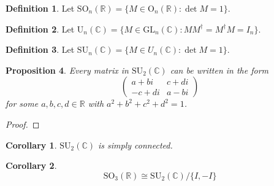\documentclass{book}
\let\qed\relax
\newtheorem{prop}{Proposition}[chapter]
\newtheorem{cor}{Corollary}[prop]
\theoremstyle{definition}
\newtheorem{df}[prop]{Definition}
\newcommand{\inv}[1]{\ensuremath{{#1}^{-1}}}
\begin{document}

\begin{df}
Let $\mathrm{SO}_n(\mathbb{R}) = \{ M \in \mathrm{O}_n(\mathbb{R}) : \det M = 1 \}$.
\end{df}

\begin{df}
Let $\mathrm{U}_n(\mathbb{C}) = \{ M \in \mathrm{GL}_n(\mathbb{C}) : M M^\dagger = M^\dagger M = I_n \}$.
\end{df}

\begin{df}
Let $\mathrm{SU}_n(\mathbb{C}) = \{ M \in U_n(\mathbb{C}) : \det M = 1 \}$.
\end{df}

\begin{prop}
Every matrix in $\mathrm{SU}_2(\mathbb{C})$ can be written in the form
\[ \left( \begin{array}{cc}
a + b i & c + d i \\
-c + di & a - bi
\end{array} \right) \]
for some $a,b,c,d \in \mathbb{R}$ with $a^2 + b^2 + c^2 + d^2 = 1$.
\end{prop}

\begin{proof}
\pf
{}
\step{2}{$\inv{M} = M^\dagger$}
\qed
\end{proof}

\begin{cor}
$\mathrm{SU}_2(\mathbb{C})$ is simply connected.
\end{cor}


\begin{cor}
\[ \mathrm{SO}_3(\mathbb{R}) \cong \mathrm{SU}_2(\mathbb{C}) / \{ I, -I \} \]
\end{cor}
\end{document}
